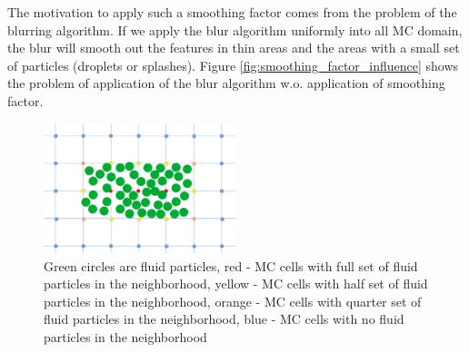 The motivation to apply such a smoothing factor comes from the problem of the blurring algorithm. If we apply the blur algorithm uniformly into all MC domain, the blur will smooth out the features in thin areas and the areas with a small set of particles (droplets or splashes). Figure \ref{fig:smoothing_factor_influence} shows the problem of application of the blur algorithm w.o. application of smoothing factor.
\begin{figure}[H]
	\begin{center}
		\includegraphics[width=0.5\textwidth]{figures/SmoothingFactorPictureExplenation.png}		
		\caption{Green circles are fluid particles, red - MC cells with full set of fluid particles in the neighborhood, yellow -  MC cells with half set of fluid particles in the neighborhood, orange - MC cells with quarter set of fluid particles in the neighborhood, blue - MC cells with no fluid particles in the neighborhood}
		\label{fig:sf_example}
	\end{center}
\end{figure}

